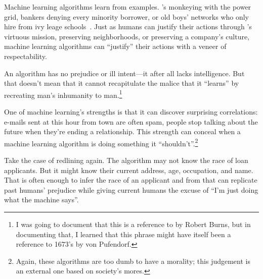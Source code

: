 Machine learning algorithms learn from examples.  \energyJerk{}'s
monkeying with the power grid, bankers denying every minority
borrower, or old boys' networks who only hire from ivy leage
schools~\citep{}.  Just as humans can justify their actions through
\energyCompany{}'s virtuous mission, preserving neighborhoods, or
preserving a company's culture, machine learning algorithms can
``justify'' their actions with a veneer of respectability.

An algorithm has no prejudice or ill intent---it after all lacks
intelligence.  But that doesn't mean that it cannot recapitulate the
malice that it ``learns'' by recreating man's inhumanity to
man.\footnote{I was going to document that this is a reference to
   by Robert Burns, but in documenting that, I learned
  that this phrase might have itself been a reference to 1673's
   by von
  Pufendorf.}

One of machine learning's strengths is that it can discover surprising
correlations: e-mails sent at this hour from town are often spam,
people stop talking about the future when they're ending a
relationship.  This strength can conceal when a machine learning
algorithm is doing something it ``shouldn't''.\footnote{Again, these
  algorithms are too dumb to have a morality; this judgement is an
  external one based on society's mores.}

Take the case of redlining again.  The algorithm may not know the race
of loan applicants.  But it might know their current address, age,
occupation, and name.  That is often enough to infer the race of an
applicant and from that can replicate past humans' prejudice while
giving current humans the excuse of ``I'm just doing what the machine
says''.


